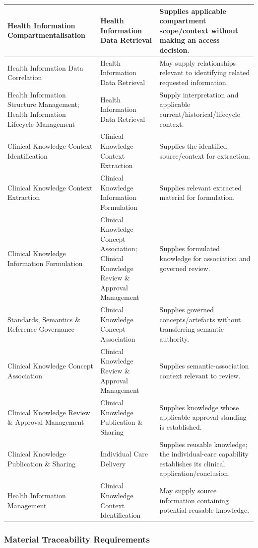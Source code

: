 \begin{longtable}{|>{\raggedright\arraybackslash}p{0.24\TableWidth}|>{\raggedright\arraybackslash}p{0.33\TableWidth}|>{\raggedright\arraybackslash}p{0.43\TableWidth}|}
Health Information Compartmentalisation & Health Information Data Retrieval & Supplies applicable compartment scope/\allowbreak{}context without making an access decision.\\\hline
Health Information Data Correlation & Health Information Data Retrieval & May supply relationships relevant to identifying related requested information.\\\hline
Health Information Structure Management; Health Information Lifecycle Management & Health Information Data Retrieval & Supply interpretation and applicable current/\allowbreak{}historical/\allowbreak{}lifecycle context.\\\hline
Clinical Knowledge Context Identification & Clinical Knowledge Context Extraction & Supplies the identified source/\allowbreak{}context for extraction.\\\hline
Clinical Knowledge Context Extraction & Clinical Knowledge Information Formulation & Supplies relevant extracted material for formulation.\\\hline
Clinical Knowledge Information Formulation & Clinical Knowledge Concept Association; Clinical Knowledge Review \& Approval Management & Supplies formulated knowledge for association and governed review.\\\hline
Standards, Semantics \& Reference Governance & Clinical Knowledge Concept Association & Supplies governed concepts/\allowbreak{}artefacts without transferring semantic authority.\\\hline
Clinical Knowledge Concept Association & Clinical Knowledge Review \& Approval Management & Supplies semantic-association context relevant to review.\\\hline
Clinical Knowledge Review \& Approval Management & Clinical Knowledge Publication \& Sharing & Supplies knowledge whose applicable approval standing is established.\\\hline
Clinical Knowledge Publication \& Sharing & Individual Care Delivery & Supplies reusable knowledge; the individual-care capability establishes its clinical application/\allowbreak{}conclusion.\\\hline
Health Information Management & Clinical Knowledge Context Identification & May supply source information containing potential reusable knowledge.\\\hline
\end{longtable}\endgroup
{}\label{rad:business:1290}
\subsubsection*{Material Traceability Requirements}
\label{rad:business:1292}

